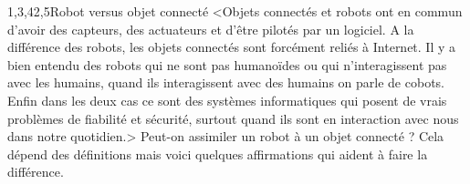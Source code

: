 \begin{quiz}[title={Informatique embarquée et objets connectés}]
\begin{quizquestion}[b]{1,3,4}{2,5}{Robot {\upshape versus} objet connecté}
<Objets connectés et robots ont en commun d'avoir des capteurs, des actuateurs et d'être pilotés par un logiciel. A la différence des robots, les objets connectés sont forcément reliés à Internet. Il y a bien entendu des robots qui ne sont pas humanoïdes ou qui n'interagissent pas avec les humains, quand ils interagissent avec des humains on parle de cobots. Enfin dans les deux cas ce sont des systèmes informatiques qui posent de vrais problèmes de fiabilité et sécurité, surtout quand ils sont en interaction avec nous dans notre quotidien.>
Peut-on assimiler un robot à un objet connecté ? Cela dépend des définitions mais voici quelques affirmations qui aident à faire la différence.
\end{quizquestion}


\end{quiz}
